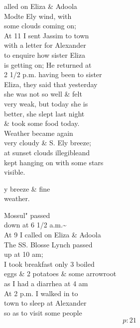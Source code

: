 \documentclass{report}
\begin{document}



	\par{
 	alled on Eliza \& Adoola\ \\Modte Ely wind, with\ \\some clouds coming on;\ \\At 11 I sent Jassim to town\ \\with a letter for Alexander\ \\to enquire how sister Eliza\ \\is getting on; He returned at\ \\2 1/2 p.m. having been to sister\ \\Eliza, they said that yesterday\ \\she was not so well \& felt\ \\very weak, but today she is\ \\better, she slept last night\ \\\& took some food today.\ \\Weather became again\ \\very cloudy \& S. Ely breeze;\ \\at sunset clouds \lbrack illegible\rbrack and\ \\kept hanging on with some stars\ \\visible.\ \\
	}


	\par{
 	y breeze \& fine\ \\weather.\ \\
	}

	\par{
 	Mossul" passed\ \\down at 6 1/2 a.m.\~{}\ \\At 9 I called on Eliza \& Adoola\ \\The SS. Blosse Lynch passed\ \\up at 10 am;\ \\I took breakfast only 3 boiled\ \\eggs \& 2 potatoes \& some arrowroot\ \\as I had a diarrhea at 4 am\ \\At 2 p.m. I walked in to\ \\town to sleep at Alexander\ \\so as to visit some people\ \\
  \[p: 21 \]

	}
\end{document}
